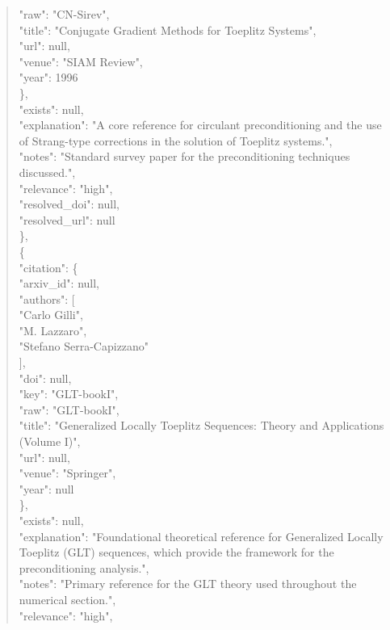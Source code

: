 \documentclass[11pt]{article}
\begin{document}
\begin{quote}
        "raw": "CN-Sirev",\\
        "title": "Conjugate Gradient Methods for Toeplitz Systems",\\
        "url": null,\\
        "venue": "SIAM Review",\\
        "year": 1996\\
      \},\\
      "exists": null,\\
      "explanation": "A core reference for circulant preconditioning and the use of Strang-type corrections in the solution of Toeplitz systems.",\\
      "notes": "Standard survey paper for the preconditioning techniques discussed.",\\
      "relevance": "high",\\
      "resolved\_doi": null,\\
      "resolved\_url": null\\
    \},\\
    \{\\
      "citation": \{\\
        "arxiv\_id": null,\\
        "authors": [\\
          "Carlo Gilli",\\
          "M. Lazzaro",\\
          "Stefano Serra-Capizzano"\\
        ],\\
        "doi": null,\\
        "key": "GLT-bookI",\\
        "raw": "GLT-bookI",\\
        "title": "Generalized Locally Toeplitz Sequences: Theory and Applications (Volume I)",\\
        "url": null,\\
        "venue": "Springer",\\
        "year": null\\
      \},\\
      "exists": null,\\
      "explanation": "Foundational theoretical reference for Generalized Locally Toeplitz (GLT) sequences, which provide the framework for the preconditioning analysis.",\\
      "notes": "Primary reference for the GLT theory used throughout the numerical section.",\\
      "relevance": "high",\\

\end{quote}
\end{document}

